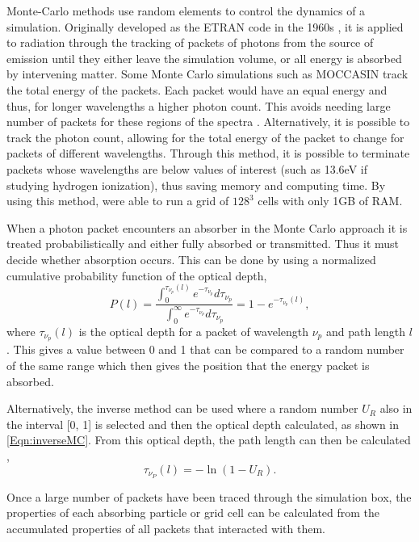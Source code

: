 Monte-Carlo methods use random elements to control the dynamics of a simulation. Originally developed as the ETRAN code in the 1960s \citep{ETRAN}, it is applied to radiation through the tracking of packets of photons from the source of emission until they either leave the simulation volume, or all energy is absorbed by intervening matter. Some Monte Carlo simulations such as MOCCASIN \citep{MC1} track the total energy of the packets. Each packet would have an equal energy and thus, for longer wavelengths a higher photon count. This avoids needing large number of packets for these regions of the spectra \citep{MC2}. Alternatively, it is possible to track the photon count, allowing for the total energy of the packet to change for packets of different wavelengths. Through this method, it is possible to terminate packets whose wavelengths are below values of interest (such as 13.6eV if studying hydrogen ionization), thus saving memory and computing time. By using this method, \citep{MC6} were able to run a grid of $128^3$ cells with only 1GB of RAM.

When a photon packet encounters an absorber in the Monte Carlo approach it is treated probabilistically and either fully absorbed or transmitted. Thus it must decide whether absorption occurs. This can be done by using a normalized cumulative probability function of the optical depth,
\begin{equation}
    P(l) = \frac{\int_{0}^{\tau_{\nu_p}(l)} e^{-\tau_{\nu_p}} d\tau_{\nu_p}}{\int_{0}^{\infty} e^{-\tau_{\nu_p}} d\tau_{\nu_p}} = 1 - e^{-\tau_{\nu_p}(l)},
\end{equation}
where $\tau_{\nu_p}(l)$ is the optical depth for a packet of wavelength $\nu_p$ and path length $l$ \citep{MC1}. This gives a value between 0 and 1 that can be compared to a random number of the same range which then gives the position that the energy packet is absorbed.

Alternatively, the inverse method can be used where a random number $U_R$ also in the interval [0, 1] is selected and then the optical depth calculated, as shown in \ref{Eqn:inverseMC}. From this optical depth, the path length can then be calculated \citep{MC4},
\begin{equation}
    \label{Eqn:inverseMC}
    \tau_{\nu_P}(l) = -\ln(1 - U_R).
\end{equation}

Once a large number of packets have been traced through the simulation box, the properties of each absorbing particle or grid cell can be calculated from the accumulated properties of all packets that interacted with them. 

